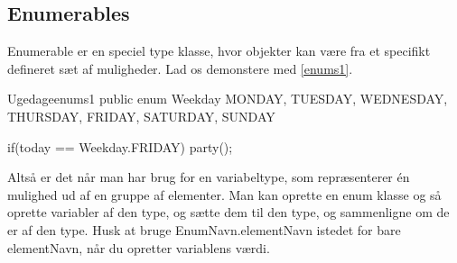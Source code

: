 \subsection{Enumerables}
Enumerable er en speciel type klasse, hvor objekter kan være fra et specifikt defineret sæt af muligheder. Lad os demonstere med \autoref{enums1}.
\begin{JavaCode}{Ugedage}{enums1}
	public enum Weekday{
		MONDAY, 
		TUESDAY, 
		WEDNESDAY, 
		THURSDAY, 
		FRIDAY, 
		SATURDAY, 
		SUNDAY
	}
	
	if(today == Weekday.FRIDAY){
		party();
	}
\end{JavaCode}
Altså er det når man har brug for en variabeltype, som repræsenterer én mulighed ud af en gruppe af elementer. Man kan oprette en enum klasse og så oprette variabler af den type, og sætte dem til den type, og sammenligne om de er af den type. Husk at bruge EnumNavn.elementNavn istedet for bare elementNavn, når du opretter variablens værdi.

